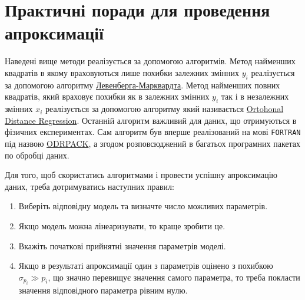 \documentclass{LabBook}
\begin{document}


\section{Практичні поради для проведення апроксимації}


Наведені вище методи реалізується за допомогою алгоритмів. Метод найменших квадратів в якому враховуються лише похибки залежних змінних $y_i$ реалізується за допомогою алгоритму \href{https://en.wikipedia.org/wiki/Levenberg–Marquardt_algorithm}{Левенберга-Марквардта}. Метод найменших повних квадратів, який враховує похибки як в залежних змінних $y_i$ так і в незалежних змінних $x_i$  реалізується за допомогою алгоритму який називається \href{https://en.wikipedia.org/wiki/Total_least_squares}{Ortohonal Distance Regression}. Останній алгоритм важливий для даних, що отримуються в фізичних експериментах. Сам алгоритм був вперше реалізований на мові \texttt{FORTRAN} під назвою \href{https://dl.acm.org/doi/10.1145/1268776.1268782}{ODRPACK}, а згодом розповсюджений  в багатьох програмних пакетах по обробці даних.

Для того, щоб скористатись алгоритмами і провести успішну апроксимацію даних, треба дотримуватись наступних правил:
\begin{enumerate}
	\item Виберіть відповідну модель та визначте число можливих параметрів.
	\item Якщо модель можна лінеаризувати, то краще зробити це.
	\item Вкажіть початкові прийнятні значення параметрів моделі.
	\item Якщо в результаті апроксимації один з параметрів оцінено з похибкою $\sigma_{p_i} \gg p_i$, що значно перевищує значення самого параметра, то треба покласти значення відповідного параметра рівним нулю.
\end{enumerate}
\end{document}
